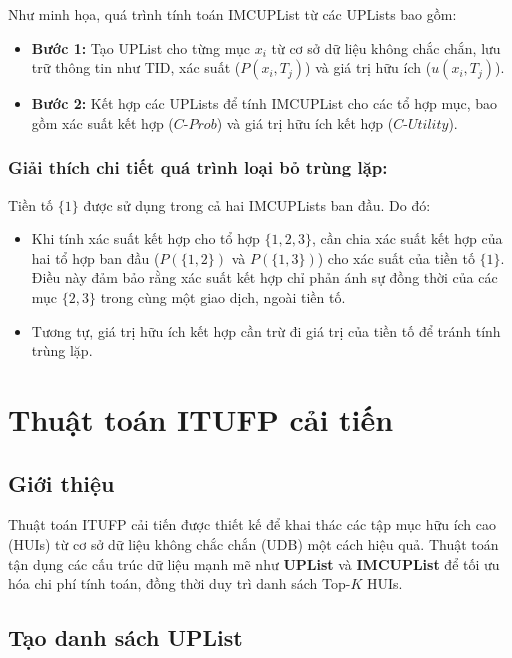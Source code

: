 \documentclass[conference]{IEEEtran}
\begin{document}
Như minh họa, quá trình tính toán IMCUPList từ các UPLists bao gồm:
\begin{itemize}
    \item \textbf{Bước 1:} Tạo UPList cho từng mục \(x_i\) từ cơ sở dữ liệu không chắc chắn, lưu trữ thông tin như TID, xác suất (\(P(x_i, T_j)\)) và giá trị hữu ích (\(u(x_i, T_j)\)).
    \item \textbf{Bước 2:} Kết hợp các UPLists để tính IMCUPList cho các tổ hợp mục, bao gồm xác suất kết hợp (\(C\text{-}Prob\)) và giá trị hữu ích kết hợp (\(C\text{-}Utility\)).
\end{itemize}


\subsubsection{Giải thích chi tiết quá trình loại bỏ trùng lặp:}
Tiền tố \(\{1\}\) được sử dụng trong cả hai IMCUPLists ban đầu. Do đó:
\begin{itemize}
    \item Khi tính xác suất kết hợp cho tổ hợp \(\{1, 2, 3\}\), cần chia xác suất kết hợp của hai tổ hợp ban đầu (\(P(\{1, 2\})\) và \(P(\{1, 3\})\)) cho xác suất của tiền tố \(\{1\}\). Điều này đảm bảo rằng xác suất kết hợp chỉ phản ánh sự đồng thời của các mục \(\{2, 3\}\) trong cùng một giao dịch, ngoài tiền tố.
    \item Tương tự, giá trị hữu ích kết hợp cần trừ đi giá trị của tiền tố để tránh tính trùng lặp.
\end{itemize}

\section{Thuật toán ITUFP cải tiến}
\label{sec:itu_algorithm}

\subsection{Giới thiệu}
Thuật toán ITUFP cải tiến được thiết kế để khai thác các tập mục hữu ích cao (HUIs) từ cơ sở dữ liệu không chắc chắn (UDB) một cách hiệu quả. Thuật toán tận dụng các cấu trúc dữ liệu mạnh mẽ như \textbf{UPList} và \textbf{IMCUPList} để tối ưu hóa chi phí tính toán, đồng thời duy trì danh sách Top-\(K\) HUIs.


\subsection{Tạo danh sách UPList}
\end{document}
